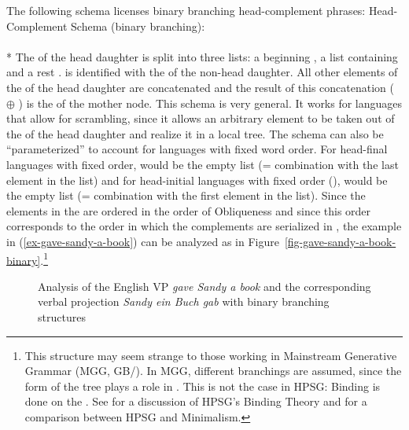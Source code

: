 \documentclass[output=paper,biblatex,babelshorthands,newtxmath,draftmode,colorlinks,citecolor=brown]{langscibook}
\begin{document}
The following schema licenses binary branching head-complement phrases:
\ea
Head-Complement Schema (binary branching):\\
\label{hcs-binary}\label{order-hcs-binary}
 \impl\\*
\z
The \compsl of the head daughter is split into three lists: a beginning , a list containing  and a rest
.  is identified with the \synsemv of the non-head daughter. All other elements of
the \compsl of the head daughter are concatenated and the result of this concatenation (
$\oplus$ ) is the \compsl of the mother node. This schema is very general. It works for
languages that allow for scrambling, since it allows an arbitrary element to be taken out of the \compsl
of the head daughter and realize it in a local tree. The schema can also be ``parameterized'' to account
for languages with fixed word order. For head-final languages with fixed order,  would be the
empty list (= combination with the last element in the list) and for head-initial languages with
fixed order (\eg {}),  would be the empty list (= combination with the first element in
the list). Since the elements in the \compsl are ordered in the order of Obliqueness \citep{KC77a,Pullum77a} and since this
order corresponds to the order in which the complements are serialized in , the example in (\ref{ex-gave-sandy-a-book}) can be
analyzed as in Figure~\ref{fig-gave-sandy-a-book-binary}.\footnote{
  This structure may seem strange to those working in Mainstream Generative Grammar (MGG,
  GB/). In MGG, different branchings are assumed, since the form of the tree plays a role in
  . This is not the case in HPSG: Binding is done on the \argstl. See
   for a discussion of HPSG's Binding Theory and
   for a comparison between HPSG and Minimalism.%
}
\begin{figure}
\hfill
{}
\caption{\label{fig-gave-sandy-a-book-binary}\label{fig-sandy-ein-buch-gab}Analysis of the English VP \emph{gave Sandy a book} and
  the corresponding  verbal projection \emph{Sandy ein Buch gab} with binary branching structures}
\end{figure}
\end{document}
